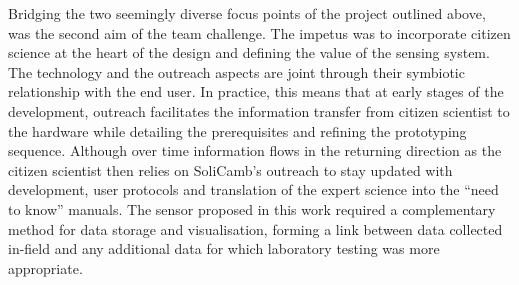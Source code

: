 Bridging the two seemingly diverse focus points of the project outlined above, was the second aim of the team challenge. The impetus was to incorporate citizen science at the heart of the design and defining the value of the sensing system. The technology and the outreach aspects are joint through their symbiotic relationship with the end user. In practice, this means that at early stages of the development, outreach facilitates the information transfer from citizen scientist to the hardware while detailing the prerequisites and refining the prototyping sequence. Although over time information flows in the returning direction as the citizen scientist then relies on SoliCamb's outreach to stay updated with development, user protocols and translation of the expert science into the ``need to know'' manuals. %
The sensor proposed in this work required a complementary method for data storage and visualisation, forming a link between data collected in-field and any additional data for which laboratory testing was more appropriate. %



